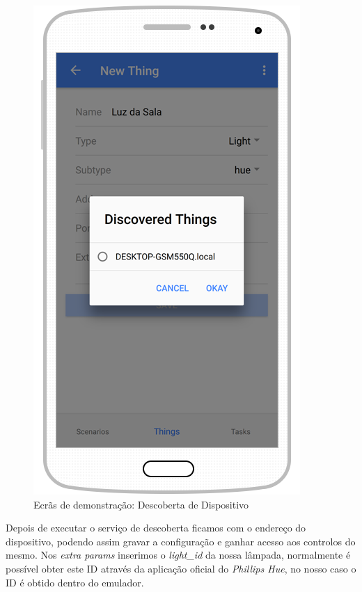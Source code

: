 \begin{figure}[H]
  \centering
        \includegraphics[scale=0.75]{img/demo/new_thing_discovery.png}
  \caption{Ecrãs de demonstração: Descoberta de Dispositivo}
\end{figure}

Depois de executar o serviço de descoberta ficamos com o endereço do dispositivo, podendo assim gravar a configuração e ganhar acesso aos controlos do mesmo. Nos \textit{extra params} inserimos o \textit{light\_id} da nossa lâmpada, normalmente é possível obter este ID através da aplicação oficial do \textit{Phillips Hue}, no nosso caso o ID é obtido dentro do emulador.

